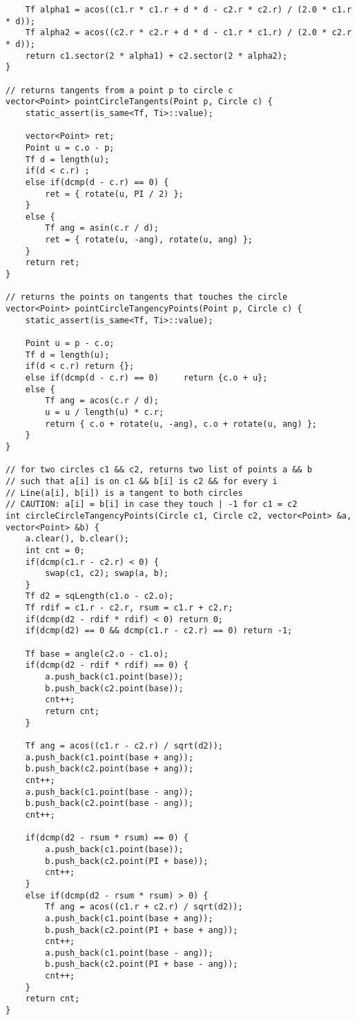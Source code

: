 \documentclass[FSZ,a4paper,onesided]{article}
\begin{document}
\begin{multicols*}{\COLS}
\begin{lstlisting}
    Tf alpha1 = acos((c1.r * c1.r + d * d - c2.r * c2.r) / (2.0 * c1.r * d));
    Tf alpha2 = acos((c2.r * c2.r + d * d - c1.r * c1.r) / (2.0 * c2.r * d));
    return c1.sector(2 * alpha1) + c2.sector(2 * alpha2);
}

// returns tangents from a point p to circle c
vector<Point> pointCircleTangents(Point p, Circle c) {
    static_assert(is_same<Tf, Ti>::value);

    vector<Point> ret;
    Point u = c.o - p;
    Tf d = length(u);
    if(d < c.r) ;
    else if(dcmp(d - c.r) == 0) {
        ret = { rotate(u, PI / 2) };
    }
    else {
        Tf ang = asin(c.r / d);
        ret = { rotate(u, -ang), rotate(u, ang) };
    }
    return ret;
}

// returns the points on tangents that touches the circle
vector<Point> pointCircleTangencyPoints(Point p, Circle c) {
    static_assert(is_same<Tf, Ti>::value);

    Point u = p - c.o;
    Tf d = length(u);
    if(d < c.r) return {};
    else if(dcmp(d - c.r) == 0)     return {c.o + u};
    else {
        Tf ang = acos(c.r / d);
        u = u / length(u) * c.r;
        return { c.o + rotate(u, -ang), c.o + rotate(u, ang) };
    }
}

// for two circles c1 && c2, returns two list of points a && b
// such that a[i] is on c1 && b[i] is c2 && for every i
// Line(a[i], b[i]) is a tangent to both circles
// CAUTION: a[i] = b[i] in case they touch | -1 for c1 = c2
int circleCircleTangencyPoints(Circle c1, Circle c2, vector<Point> &a, vector<Point> &b) {
    a.clear(), b.clear();
    int cnt = 0;
    if(dcmp(c1.r - c2.r) < 0) {
        swap(c1, c2); swap(a, b);
    }
    Tf d2 = sqLength(c1.o - c2.o);
    Tf rdif = c1.r - c2.r, rsum = c1.r + c2.r;
    if(dcmp(d2 - rdif * rdif) < 0) return 0;
    if(dcmp(d2) == 0 && dcmp(c1.r - c2.r) == 0) return -1;

    Tf base = angle(c2.o - c1.o);
    if(dcmp(d2 - rdif * rdif) == 0) {
        a.push_back(c1.point(base));
        b.push_back(c2.point(base));
        cnt++;
        return cnt;
    }

    Tf ang = acos((c1.r - c2.r) / sqrt(d2));
    a.push_back(c1.point(base + ang));
    b.push_back(c2.point(base + ang));
    cnt++;
    a.push_back(c1.point(base - ang));
    b.push_back(c2.point(base - ang));
    cnt++;

    if(dcmp(d2 - rsum * rsum) == 0) {
        a.push_back(c1.point(base));
        b.push_back(c2.point(PI + base));
        cnt++;
    }
    else if(dcmp(d2 - rsum * rsum) > 0) {
        Tf ang = acos((c1.r + c2.r) / sqrt(d2));
        a.push_back(c1.point(base + ang));
        b.push_back(c2.point(PI + base + ang));
        cnt++;
        a.push_back(c1.point(base - ang));
        b.push_back(c2.point(PI + base - ang));
        cnt++;
    }
    return cnt;
}\end{lstlisting}

\end{multicols*}
\end{document}
